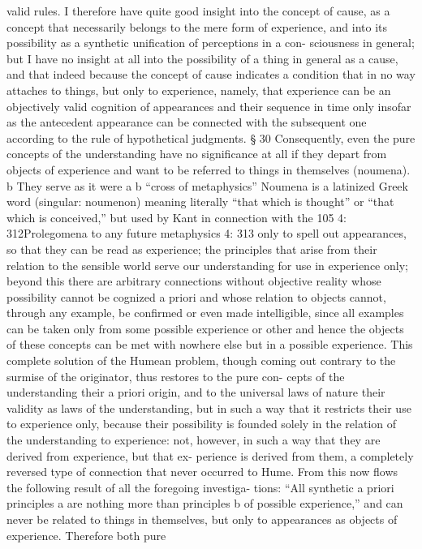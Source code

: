 valid rules. I therefore have quite good insight into the concept of cause,
as a concept that necessarily belongs to the mere form of experience,
and into its possibility as a synthetic uniﬁcation of perceptions in a con-
sciousness in general; but I have no insight at all into the possibility of
a thing in general as a cause, and that indeed because the concept of
cause indicates a condition that in no way attaches to things, but only to
experience, namely, that experience can be an objectively valid cognition
of appearances and their sequence in time only insofar as the antecedent
appearance can be connected with the subsequent one according to the
rule of hypothetical judgments.
§ 30
Consequently, even the pure concepts of the understanding have no
signiﬁcance at all if they depart from objects of experience and want to
be referred to things in themselves (noumena). b They serve as it were
a
b
“cross of metaphysics”
Noumena is a latinized Greek word (singular: noumenon) meaning literally “that which
is thought” or “that which is conceived,” but used by Kant in connection with the
105
4: 312Prolegomena to any future metaphysics
4: 313
only to spell out appearances, so that they can be read as experience;
the principles that arise from their relation to the sensible world serve
our understanding for use in experience only; beyond this there are
arbitrary connections without objective reality whose possibility cannot
be cognized a priori and whose relation to objects cannot, through any
example, be conﬁrmed or even made intelligible, since all examples can
be taken only from some possible experience or other and hence the
objects of these concepts can be met with nowhere else but in a possible
experience.
This complete solution of the Humean problem, though coming out
contrary to the surmise of the originator, thus restores to the pure con-
cepts of the understanding their a priori origin, and to the universal laws
of nature their validity as laws of the understanding, but in such a way
that it restricts their use to experience only, because their possibility is
founded solely in the relation of the understanding to experience: not,
however, in such a way that they are derived from experience, but that ex-
perience is derived from them, a completely reversed type of connection
that never occurred to Hume.
From this now ﬂows the following result of all the foregoing investiga-
tions: “All synthetic a priori principles a are nothing more than principles b
of possible experience,” and can never be related to things in themselves,
but only to appearances as objects of experience. Therefore both pure
